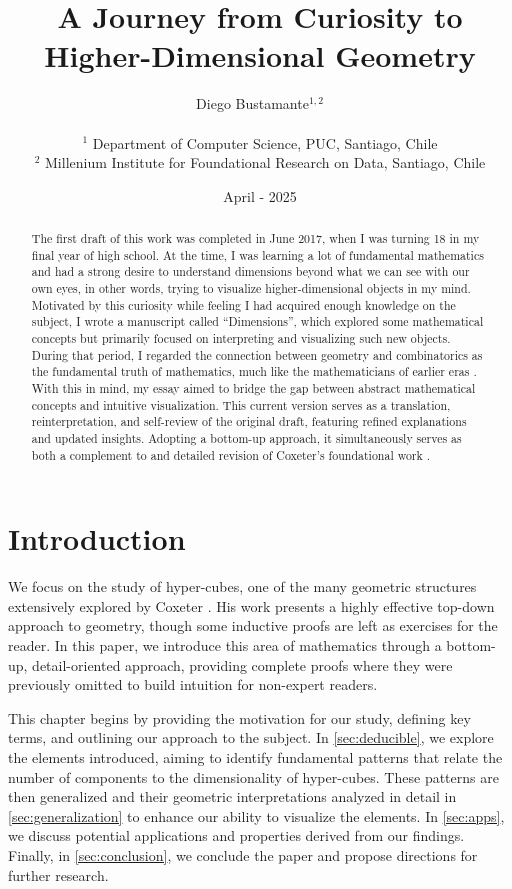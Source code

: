 \documentclass{article}
\title{A Journey from Curiosity to Higher-Dimensional Geometry}
\date{April - 2025}
\author{%
	Diego Bustamante$^{1,2}$\\ \\
	{$^1$ Department of Computer Science, PUC, Santiago, Chile}\\
	{$^2$ Millenium Institute for Foundational Research on Data, Santiago, Chile}\\
}
\begin{document}
	\setcounter{page}{1}
	
	\maketitle

	\begin{abstract}
		The first draft of this work was completed in June 2017, when I was turning 18 in my final year of high school. At the time, I was learning a lot of fundamental mathematics and had a strong desire to understand dimensions beyond what we can see with our own eyes, in other words, trying to visualize higher-dimensional objects in my mind. Motivated by this curiosity while feeling I had acquired enough knowledge on the subject, I wrote a manuscript called ``Dimensions'', which explored some mathematical concepts but primarily focused on interpreting and visualizing such new objects. During that period, I regarded the connection between geometry and combinatorics as the fundamental truth of mathematics, much like the mathematicians of earlier eras \cite{euclid}. With this in mind, my essay aimed to bridge the gap between abstract mathematical concepts and intuitive visualization. This current version serves as a translation, reinterpretation, and self-review of the original draft, featuring refined explanations and updated insights. Adopting a bottom-up approach, it simultaneously serves as both a complement to and detailed revision of Coxeter's foundational work \cite{coxeter1973regular}.
	\end{abstract}

	\section{Introduction \label{sec:intro}}
	
	We focus on the study of hyper-cubes, one of the many geometric structures extensively explored by Coxeter \cite{coxeter1973regular}. His work presents a highly effective top-down approach to geometry, though some inductive proofs are left as exercises for the reader. In this paper, we introduce this area of mathematics through a bottom-up, detail-oriented approach, providing complete proofs where they were previously omitted to build intuition for non-expert readers.
	
	This chapter begins by providing the motivation for our study, defining key terms, and outlining our approach to the subject. In \autoref{sec:deducible}, we explore the elements introduced, aiming to identify fundamental patterns that relate the number of components to the dimensionality of hyper-cubes. These patterns are then generalized and their geometric interpretations analyzed in detail in \autoref{sec:generalization} to enhance our ability to visualize the elements. In \autoref{sec:apps}, we discuss potential applications and properties derived from our findings. Finally, in \autoref{sec:conclusion}, we conclude the paper and propose directions for further research.
		
\end{document}
